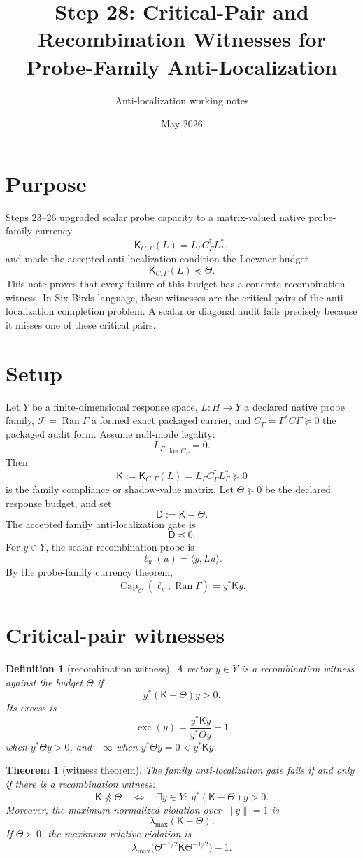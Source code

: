 \documentclass[11pt]{article}
\title{Step 28: Critical-Pair and Recombination Witnesses for Probe-Family Anti-Localization}
\author{Anti-localization working notes}
\date{May 2026}
\newtheorem{theorem}{Theorem}
\newtheorem{definition}{Definition}
\newcommand{\Ran}{\operatorname{Ran}}
\newcommand{\Capacity}{\operatorname{Cap}}
\newcommand{\K}{\mathsf K}
\newcommand{\Th}{\Theta}
\newcommand{\Def}{\mathsf D}
\begin{document}
\maketitle

\section*{Purpose}
Steps 23--26 upgraded scalar probe capacity to a matrix-valued native probe-family currency
\[
  \K_{C,\Gamma}(L)=L_\Gamma C_\Gamma^\dagger L_\Gamma^*,
\]
and made the accepted anti-localization condition the Loewner budget
\[
  \K_{C,\Gamma}(L)\preceq \Th .
\]
This note proves that every failure of this budget has a concrete recombination witness.  In Six Birds language, these witnesses are the critical pairs of the anti-localization completion problem.  A scalar or diagonal audit fails precisely because it misses one of these critical pairs.

\section{Setup}
Let $Y$ be a finite-dimensional response space, $L:H\to Y$ a declared native probe family, $\mathcal F=\Ran \Gamma$ a formed exact packaged carrier, and $C_\Gamma=\Gamma^*C\Gamma\succeq0$ the packaged audit form.  Assume null-mode legality:
\[
  L_\Gamma|_{\ker C_\Gamma}=0 .
\]
Then
\[
  \K:=\K_{C,\Gamma}(L)=L_\Gamma C_\Gamma^\dagger L_\Gamma^*\succeq0
\]
is the family compliance or shadow-value matrix.  Let $\Th\succeq0$ be the declared response budget, and set
\[
  \Def:=\K-\Th .
\]
The accepted family anti-localization gate is
\[
  \Def\preceq0.
\]
For $y\in Y$, the scalar recombination probe is
\[
  \ell_y(u)=\langle y,Lu\rangle.
\]
By the probe-family currency theorem,
\[
  \Capacity_C(\ell_y;\Ran\Gamma)=y^*\K y.
\]

\section{Critical-pair witnesses}

\begin{definition}[recombination witness]
A vector $y\in Y$ is a recombination witness against the budget $\Th$ if
\[
  y^*(\K-\Th)y>0 .
\]
Its excess is
\[
  \operatorname{exc}(y)=\frac{y^*\K y}{y^*\Th y}-1
\]
when $y^*\Th y>0$, and $+\infty$ when $y^*\Th y=0<y^*\K y$.
\end{definition}

\begin{theorem}[witness theorem]
The family anti-localization gate fails if and only if there is a recombination witness:
\[
  \K\npreceq\Th
  \quad\Longleftrightarrow\quad
  \exists y\in Y:\ y^*(\K-\Th)y>0 .
\]
Moreover, the maximum normalized violation over $\|y\|=1$ is
\[
  \lambda_{\max}(\K-\Th).
\]
If $\Th\succ0$, the maximum relative violation is
\[
  \lambda_{\max}\bigl(\Th^{-1/2}\K\Th^{-1/2}\bigr)-1 .
\]
\end{theorem}
\end{document}
